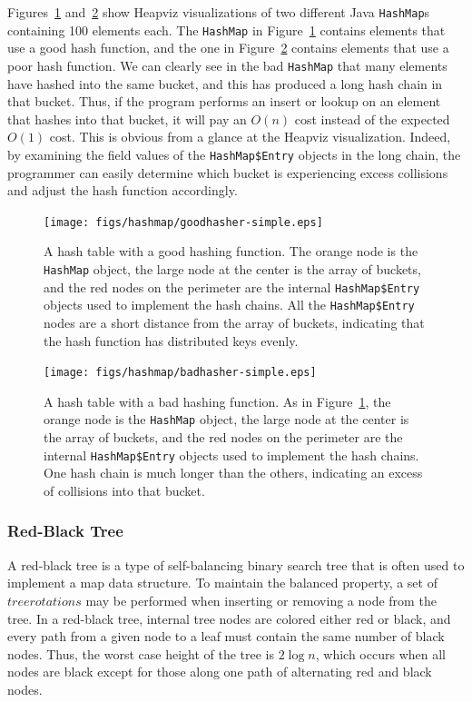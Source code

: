 Figures~\ref{fig:goodhasher} and~\ref{fig:badhasher} show Heapviz 
visualizations of two different
Java \texttt{HashMap}s containing 100 elements each.  The \texttt{HashMap} in
Figure~\ref{fig:goodhasher} contains elements that use a good hash 
function, and the one in Figure~\ref{fig:badhasher}
contains elements that use a poor hash function.  We can clearly see 
in the bad \texttt{HashMap} that many elements have hashed into the same
bucket, and this has produced a long hash chain in that bucket.  Thus, if
the program performs an insert or lookup on an element that hashes into that 
bucket, it will pay an $O(n)$ cost instead of the expected $O(1)$ cost.
This is obvious from a glance at the Heapviz visualization.
Indeed, by examining the field values of the 
\texttt{HashMap\$Entry} objects in the long chain, the programmer can easily
determine which bucket is experiencing excess collisions and adjust the
hash function accordingly.

\begin{figure}
  \texttt{[image: figs/hashmap/goodhasher-simple.eps]}
  \caption{A hash table with a good hashing function. The orange node is the 
  \texttt{HashMap} object, the large node at the center is the array of 
  buckets, and the red nodes on the perimeter are the internal 
  \texttt{HashMap\$Entry} objects used to implement the hash chains. 
  All the \texttt{HashMap\$Entry} nodes are a short distance
  from the array of buckets, indicating that the hash function has distributed
  keys evenly.}
  \label{fig:goodhasher}
\end{figure}

\begin{figure}
  \texttt{[image: figs/hashmap/badhasher-simple.eps]}
  \caption{A hash table with a bad hashing function. As in 
  Figure~\ref{fig:goodhasher}, the orange node is the 
  \texttt{HashMap} object, the large node at the center is the array of 
  buckets, and the red nodes on the perimeter are the internal 
  \texttt{HashMap\$Entry} objects used to implement the hash chains. 
  One hash chain is much longer than the others, indicating an excess of
  collisions into that bucket.}
  \label{fig:badhasher}
\end{figure}

\subsubsection{Red-Black Tree}

A red-black tree is a type of self-balancing binary search tree that is
often used to implement a map data structure. To maintain the balanced 
property, a set of $tree rotations$ may be performed when inserting or 
removing a node from the tree.  In a red-black tree, internal tree nodes are
colored either red or black, and every path from a given node to a leaf
must contain the same number of black nodes. Thus, the worst case height 
of the tree is $2 \log n$, which occurs when all nodes are black except 
for those along one path of alternating red and black nodes.

